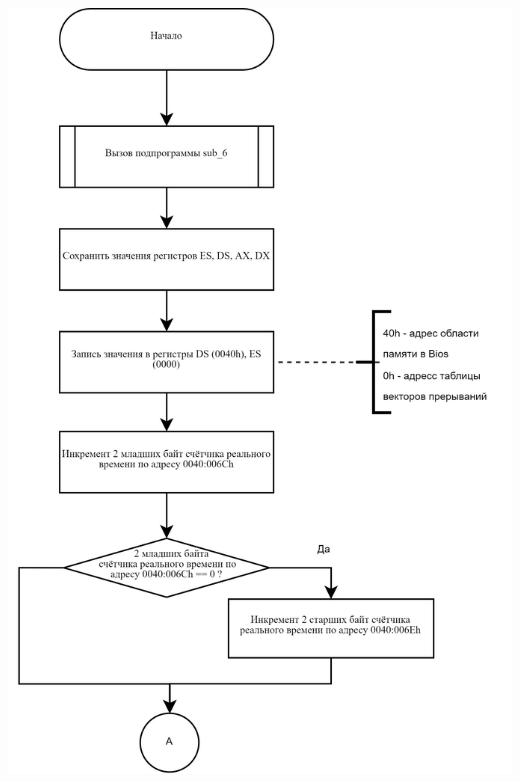 \documentclass[a4paper,14pt]{article}
\begin{document}
\begin{flushright}
	\includegraphics[height=0.875\textheight]{img/int_8h-1.png}
	\clearpage

\end{flushright}
\end{document}
